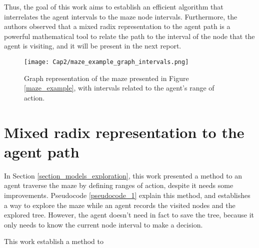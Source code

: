 Thus, the goal of this work aims to establish an efficient algorithm that interrelates the agent intervals to the maze node intervals. Furthermore, the authors observed that a mixed radix representation to the agent path is a powerful mathematical tool to relate the path to the interval of the node that the agent is visiting, and it will be present in the next report.

\begin{figure}[ht!]
\centering
\texttt{[image: Cap2/maze\_example\_graph\_intervals.png]}
\caption{Graph representation of the maze presented in Figure \ref{maze_example}, with intervals related to the agent's range of action.}
\label{maze_example_graph_intervals}
\end{figure}	

\section{Mixed radix representation to the agent path}
\label{section_models_mixed_radix}
In Section \ref{section_models_exploration}, this work presented a method to an agent traverse the maze by defining ranges of action, despite it needs some improvements. Pseudocode \ref{pseudocode_1} explain this method, and establishes a way to explore the maze while an agent records the visited nodes and the explored tree. However, the agent doesn't need in fact to save the tree, because it only needs to know the current node interval to make a decision.

This work establish a method to 